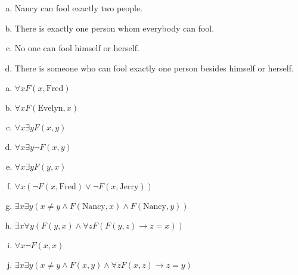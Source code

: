 \begin{itemize}
\begin{enumerate}[a.]
              \item Nancy can fool exactly two people.
              \item There is exactly one person whom everybody can fool.
              \item No one can fool himself or herself.
              \item There is someone who can fool exactly one person besides himself or herself.
          \end{enumerate}
          \answer
          \begin{enumerate}[a.]
              \item $\forall xF(x, \text{Fred})$
              \item $\forall xF(\text{Evelyn}, x)$
              \item $\forall x \exists yF(x,y)$
              \item $\forall x \exists y \neg F(x,y)$
              \item $\forall x \exists y F(y, x)$
              \item $\forall x(\neg F(x, \text{Fred}) \lor \neg F(x, \text{Jerry}))$
              \item $\exists x \exists y (x \neq y \land F(\text{Nancy}, x) \land F(\text{Nancy}, y))$
              \item $\exists x \forall y (F(y, x) \land \forall zF(F(y,z) \to z = x))$
              \item $\forall x \neg F(x, x)$
              \item $\exists x \exists y (x \neq y \land F(x, y) \land \forall zF(x,z) \to z = y)$
          \end{enumerate}
\end{itemize}

